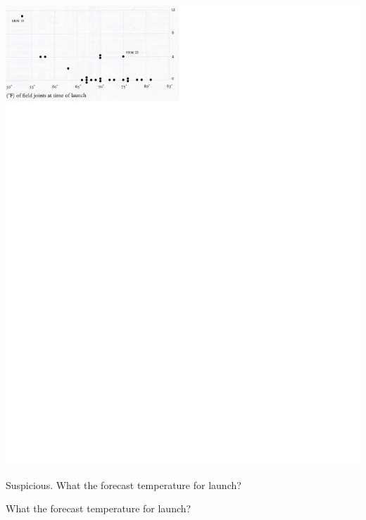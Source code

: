 \documentclass[pdflatex,landscape,titlepage]{foils}
\begin{document}
\color{black}
\begin{center}
\includegraphics[width=9.5 in]{tufte_challenger_1}
\end{center}
\color{white}

Suspicious.  What the forecast temperature for launch?  

\bgclear

What the forecast temperature for launch?
\end{document}
